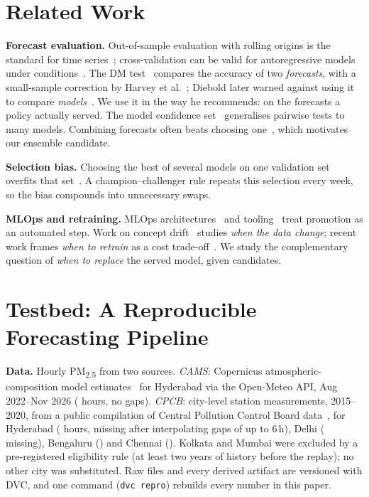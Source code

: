 \documentclass[conference]{IEEEtran}
\begin{document}
\section{Related Work}

\textbf{Forecast evaluation.} Out-of-sample evaluation with rolling origins is the standard for
time series~\cite{tashman2000}; cross-validation can be valid for autoregressive models under
conditions~\cite{bergmeir2018}. The DM test~\cite{diebold1995} compares the accuracy of two
\emph{forecasts}, with a small-sample correction by Harvey et al.~\cite{harvey1997}; Diebold later
warned against using it to compare \emph{models}~\cite{diebold2015}. We use it in the way he recommends: on
the forecasts a policy actually served. The model confidence set~\cite{hansen2011} generalises
pairwise tests to many models. Combining forecasts often beats choosing one~\cite{timmermann2006},
which motivates our ensemble candidate.

\textbf{Selection bias.} Choosing the best of several models on one validation set overfits that
set~\cite{cawley2010}. A champion--challenger rule repeats this selection every week, so the bias
compounds into unnecessary swaps.

\textbf{MLOps and retraining.} MLOps architectures~\cite{kreuzberger2023} and tooling~\cite{zaharia2018}
treat promotion as an automated step. Work on concept drift~\cite{gama2014} studies \emph{when the
data change}; recent work frames \emph{when to retrain} as a cost trade-off~\cite{regol2025}.
We study the complementary question of \emph{when to replace} the served model, given candidates.

\section{Testbed: A Reproducible Forecasting Pipeline}

\textbf{Data.} Hourly PM\textsubscript{2.5} from two sources. \emph{CAMS}: Copernicus
atmospheric-composition model estimates~\cite{inness2019} for Hyderabad via the Open-Meteo API,
Aug 2022--Nov 2026 ( hours, no gaps). \emph{CPCB}: city-level station measurements,
2015--2020, from a public compilation of Central Pollution Control Board data~\cite{rao2020kaggle},
for Hyderabad ( hours,  missing after interpolating gaps of
up to 6\,h), Delhi ( missing), Bengaluru
() and Chennai (). Kolkata and Mumbai
were excluded by a pre-registered eligibility rule (at least two years of history before the
replay); no other city was substituted. Raw files and every derived artifact are versioned with
DVC, and one command (\texttt{dvc repro}) rebuilds every number in this paper.
\end{document}
